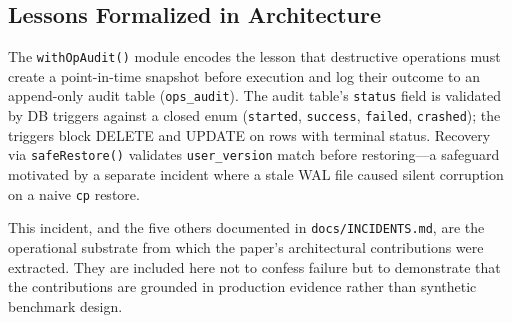 \begin{table}[!ht]
  \centering
  \caption{Changes implemented post-incident 2026-04-25}
  \label{tab:incident-changes}
\end{table}

\subsection{Lessons Formalized in Architecture}

The \texttt{withOpAudit()} module encodes the lesson that destructive operations must
create a point-in-time snapshot before execution and log their outcome to an append-only
audit table (\texttt{ops\_audit}). The audit table's \texttt{status} field is validated
by DB triggers against a closed enum (\texttt{started}, \texttt{success},
\texttt{failed}, \texttt{crashed}); the triggers block DELETE and UPDATE on rows with
terminal status. Recovery via \texttt{safeRestore()} validates \texttt{user\_version}
match before restoring---a safeguard motivated by a separate incident where a stale WAL
file caused silent corruption on a naive \texttt{cp} restore.

This incident, and the five others documented in \texttt{docs/INCIDENTS.md}, are the
operational substrate from which the paper's architectural contributions were extracted.
They are included here not to confess failure but to demonstrate that the contributions
are grounded in production evidence rather than synthetic benchmark design.
